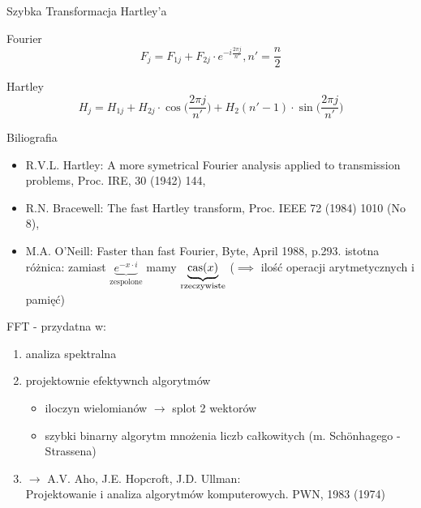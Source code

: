 \begin{frame}{Szybka Transformacja Hartley'a}
	\begin{block}{Fourier}
	\[
		F_j = F_{1j} + F_{2j} \cdot e^{-i\frac{2\pi j}{n'}} , n' = \frac{n}{2}
	\]
	\end{block}
	\begin{block}{Hartley}
	\[
		H_j = H_{1j} + H_{2j} \cdot \cos \bigg( \frac{2\pi j}{n'} \bigg) + H_2(n'-1) \cdot \sin \bigg( \frac{2\pi j}{n'} \bigg)
	\]
	\end{block}
\end{frame}
\begin{frame}{Biliografia}
	\begin{itemize}
		\item R.V.L. Hartley: A more symetrical Fourier analysis applied to transmission problems, Proc. IRE, 30 (1942) 144, \\
		\item R.N. Bracewell: The fast Hartley transform, Proc. IEEE 72 (1984) 1010 (No 8), \\
		\item M.A. O'Neill: Faster than fast Fourier, Byte, April 1988, p.293. istotna różnica: zamiast $\underbrace{e^{-x \cdot i}}_{\text{zespolone}}$ mamy $\underbrace{\operatorname{cas}(x)}_{\text{rzeczywiste}}$ ($\implies$ ilość operacji arytmetycznych i pamięć)
	\end{itemize}
\end{frame}
\begin{frame}{FFT - przydatna w:}
	\begin{enumerate}
		\item analiza spektralna \\
		\item projektownie efektywnch algorytmów
		\begin{itemize}
			\item iloczyn wielomianów $\to$ splot 2 wektorów \\
			\item szybki binarny algorytm mnożenia liczb całkowitych
			(m. Sch\"{o}nhagego - Strassena)
		\end{itemize}
		\item $\to$ A.V. Aho, J.E. Hopcroft, J.D. Ullman: \\
		Projektowanie i analiza algorytmów komputerowych. PWN, 1983 (1974)
	\end{enumerate}
\end{frame}